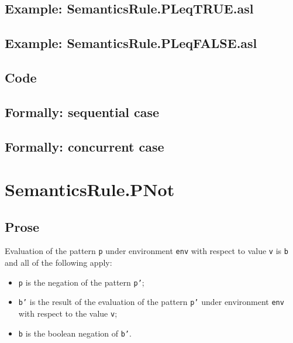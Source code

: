 \documentclass{book}
\begin{document}
    \subsection{Example: SemanticsRule.PLeqTRUE.asl}

    \subsection{Example: SemanticsRule.PLeqFALSE.asl}

  \subsection{Code}

\begin{emptyformal}
  \subsection{Formally: sequential case}

  \subsection{Formally: concurrent case}
\end{emptyformal}


\section{SemanticsRule.PNot \label{sec:SemanticsRule.PNot}}

    \subsection{Prose}
    Evaluation of the pattern \texttt{p} under environment \texttt{env} with
    respect to value \texttt{v} is \texttt{b} and all of the following apply:
    \begin{itemize}
      \item \texttt{p} is the negation of the pattern \texttt{p'};
      \item \texttt{b'} is the result of the evaluation of the pattern \texttt{p'} under environment \texttt{env} with respect to the value \texttt{v};
      \item \texttt{b} is the boolean negation of \texttt{b'}.
    \end{itemize}
\end{document}
